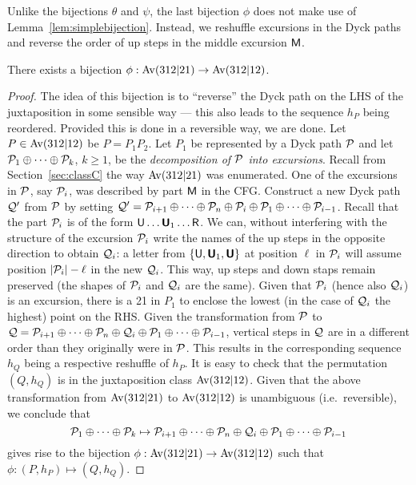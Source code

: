 Unlike the bijections $\theta$ and $\psi$, the last bijection $\phi$ does not make use of Lemma~\ref{lem:simplebijection}. Instead, we reshuffle excursions in the Dyck paths and reverse the order of up steps in the middle excursion $\fM$. 

\begin{theorem}
\label{thm:phi}
There exists a bijection $\phi: \Av(312|21) \to \Av(312|12)$. 
\end{theorem}
\begin{proof}
The idea of this bijection is to ``reverse'' the Dyck path on the LHS of the juxtaposition in some sensible way --- this also leads to the sequence $h_P$ being reordered. Provided this is done in a reversible way, we are done. Let $P \in \Av(312|12)$ be $P = P_1P_2$. Let $P_1$ be represented by a Dyck path $\P$ and let $\P_1 \oplus \cdots \oplus \P_k$, $k\geq 1$, be the \emph{decomposition of $\P$ into excursions}. Recall from Section~\ref{sec:classC} the way $\Av(312|21)$ was enumerated. One of the excursions in $\P$, say $\P_i$, was described by part $\fM$ in the CFG. Construct a new Dyck path $\Q'$ from $\P$ by setting $\Q' = \P_{i+1}\oplus \cdots \oplus \P_{n} \oplus \P_i \oplus \P_1\oplus \cdots \oplus \P_{i-1}$. Recall that the part $\P_i$ is of the form $\fU\ldots\bU_1\ldots \fR$. We can, without interfering with the structure of the excursion $\P_i$ write the names of the up steps in the opposite direction to obtain $\Q_i$: a letter from $\{\fU, \bU_1, \bU\}$ at position $\ell$ in $\P_i$ will assume position $|\P_i|-\ell$ in the new $\Q_i$. This way, up steps and down staps remain preserved (the shapes of $\P_i$ and $\Q_i$ are the same). Given that $\P_i$ (hence also $\Q_i$) is an excursion, there is a 21 in $P_1$ to enclose the lowest (in the case of $\Q_i$ the highest) point on the RHS. Given the transformation from $\P$ to $\Q = \P_{i+1}\oplus \cdots \oplus \P_{n} \oplus \Q_i \oplus \P_1\oplus \cdots \oplus \P_{i-1}$, vertical steps in $\Q$ are in a different order than they originally were in $\P$. This results in the corresponding sequence $h_Q$ being a respective reshuffle of $h_P$. It is easy to check that the permutation $(Q,h_Q)$ is in the juxtaposition class $\Av(312|12)$. Given that the above transformation from $\Av(312|21)$ to $\Av(312|12)$ is unambiguous (i.e.~reversible), we conclude that 
$$\P_1 \oplus \cdots \oplus \P_k \mapsto \P_{i+1}\oplus \cdots \oplus \P_{n} \oplus \Q_i \oplus \P_1\oplus \cdots \oplus \P_{i-1}$$
gives rise to the bijection $\phi: \Av(312|21) \to \Av(312|12)$ such that $\phi: (P,h_P) \mapsto (Q,h_Q)$.
\end{proof}

